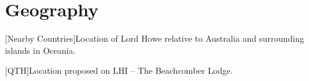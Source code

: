 \documentclass[11pt]{article}
\begin{document}
\section{Geography}

\vskip2mm
\noindent%
\begin{minipage}{\linewidth}%
\captionsetup{width=0.8\linewidth}
[Nearby Countries]{Location of Lord Howe relative to 
Australia and surrounding
islands in Oceania.}
\label{location-relative}
\end{minipage}
\vskip3mm

\noindent%
\begin{minipage}{\linewidth}%
\captionsetup{width=0.8\linewidth}
[QTH]{Location proposed on LHI -- The Beachcomber Lodge.}
\label{location-relative-qth}
\end{minipage}
\vskip3mm
\end{document}

